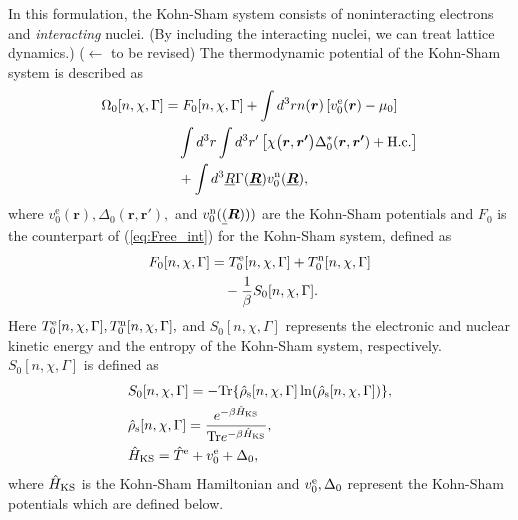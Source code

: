 In this formulation, the Kohn-Sham system consists of noninteracting electrons and {\it interacting} nuclei. 
(By including the interacting nuclei, we can treat lattice dynamics.) ($\leftarrow$ to be revised)
The thermodynamic potential of the Kohn-Sham system is described as
%
\begin{equation} %
\label{eq:grand_pot_KS}
\begin{split}
	\Omega_0[n, \chi, \Gamma] &= F_0[n, \chi, \Gamma] + \int d^3r n(\bm{r}) \left[v^{\rm e}_0(\bm{r})-\mu_0 \right] \\
						&\quad \int d^3r \int d^3r' \left[\chi \bigl(\bm{r}, \bm{r'} \bigr)
	                                       \Delta^{\ast}_0(\bm{r}, \bm{r'}) + {\rm H.c.} \right]\\
	                   &\quad+ \int d^3\underline{R} \Gamma(\underline{\bm{R}})v^{\rm n}_0(\underline{\bm{R}}),
\end{split}
\end{equation}
%
where $v^{\mathrm e}_0(\bm{r}), \Delta_0(\bm{r}, \bm{r'}),$ and $v^{\rm n}_{0}(\underline(\bm R)))$ 
are the Kohn-Sham potentials and $F_0$ is the counterpart of (\ref{eq:Free_int}) for the 
Kohn-Sham system, defined as
%
\begin{equation} %
\begin{split}
	F_0[n, \chi, \Gamma] &= T^{\rm e}_0[n, \chi, \Gamma] + T^{\rm n}_0[n, \chi, \Gamma] \\
	                                     &\quad - \frac{1}{\beta}S_0[n, \chi, \Gamma].
\end{split}
\end{equation}
%
Here $T^{\rm e}_0[n, \chi, \Gamma], T^{\rm n}_0[n, \chi, \Gamma],$ and $S_0[n, \chi, \Gamma]$ 
represents the electronic and nuclear kinetic energy and the entropy of the Kohn-Sham system, respectively.
$S_0[n, \chi, \Gamma]$ is defined as 
%
\begin{equation}
	\begin{split}
	& S_0[n, \chi, \Gamma] = -{\rm Tr}\{\hat{\rho}_{\rm s}[n, \chi, \Gamma]
	\ln(\hat{\rho}_{\rm s}[n, \chi, \Gamma])\}, \\
	& \hat{\rho}_{\rm s}[n, \chi, \Gamma] = \frac{e^{-\beta\hat{H}_{\rm KS}}}
	{ {\rm Tr}e^{-\beta\hat{H}_{\rm KS}}}, \\
	& \hat{H}_{\rm KS} = \hat{T}^{\rm e} + v^{\rm e}_0 + \Delta_0,
	\label{eq:KSentropydef}
\end{split}
\end{equation}
%
where $\hat{H}_{\rm KS}$ is the Kohn-Sham Hamiltonian and $v^{\rm e}_0, \Delta_0$ represent the 
Kohn-Sham potentials which are defined below.

